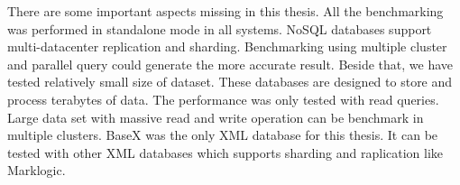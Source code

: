There are some important aspects missing in this thesis. All the benchmarking was performed in standalone mode in all systems. NoSQL databases support multi-datacenter replication and sharding. Benchmarking using multiple cluster and parallel query could generate the more accurate result. Beside that, we have tested relatively small size of dataset. These databases are designed to store and process terabytes of data. The performance was only tested with read queries. Large data set with massive read and write operation can be benchmark in multiple clusters.
BaseX was the only  XML database for this thesis. It can be tested with other XML databases which supports sharding and  raplication like Marklogic. 